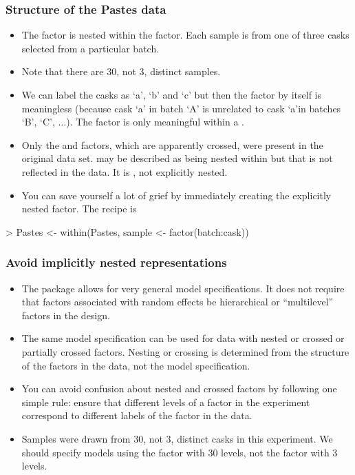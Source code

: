 \begin{frame}[fragile]
  \frametitle{Structure of the Pastes data}
  \begin{itemize}
  \item The  factor is nested within the 
    factor. Each sample is from one of three casks selected from a
    particular batch.
  \item Note that there are 30, not 3, distinct samples.
  \item We can label the casks as `a', `b' and `c' but then the
     factor by itself is meaningless (because cask `a' in
    batch `A' is unrelated to cask `a'in batches `B', `C', $\dots$).
    The  factor is only meaningful within a .
  \item Only the  and  factors, which are
    apparently crossed, were present in the original data set.
     may be described as being nested within 
    but that is not reflected in the data.  It is , not explicitly nested.
  \item You can save yourself a lot of grief by immediately creating
    the explicitly nested factor.  The recipe is
\end{itemize}
\begin{Schunk}
\begin{Sinput}
> Pastes <- within(Pastes, sample <- factor(batch:cask))
\end{Sinput}
\end{Schunk}
\end{frame}

\begin{frame}
  \frametitle{Avoid implicitly nested representations}
  \begin{itemize}
  \item The  package allows for very general model
    specifications.  It does not require that factors associated with
    random effects be hierarchical or ``multilevel'' factors in the
    design.
  \item The same model specification can be used for data with nested
    or crossed or partially crossed factors.  Nesting or crossing is
    determined from the structure of the factors in the data, not the
    model specification.
  \item You can avoid confusion about nested and crossed factors by
    following one simple rule: ensure that different levels of a
    factor in the experiment correspond to different labels of the
    factor in the data.
  \item Samples were drawn from 30, not 3, distinct casks in this
    experiment.  We should specify models using the 
    factor with 30 levels, not the  factor with 3 levels.
  \end{itemize}
\end{frame}

